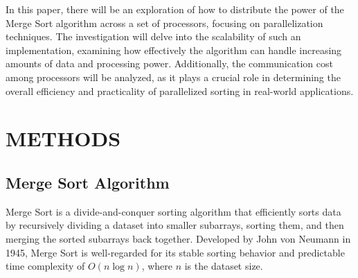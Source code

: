 \documentclass[article,12pt,conference]{ieeeconf} %
\begin{document}
In this paper, there will be an exploration of how to distribute the power of the Merge Sort algorithm across a set of processors, focusing on parallelization techniques. The investigation will delve into the scalability of such an implementation, examining how effectively the algorithm can handle increasing amounts of data and processing power. Additionally, the communication cost among processors will be analyzed, as it plays a crucial role in determining the overall efficiency and practicality of parallelized sorting in real-world applications.

\section{METHODS}

\subsection{Merge Sort Algorithm}
Merge Sort\cite{von1956new} is a divide-and-conquer sorting algorithm that efficiently sorts data by recursively dividing a dataset into smaller subarrays, sorting them, and then merging the sorted subarrays back together. Developed by John von Neumann in 1945, Merge Sort is well-regarded for its stable sorting behavior and predictable time complexity of $O(n \log n)$, where $n$ is the dataset size.
\end{document}

